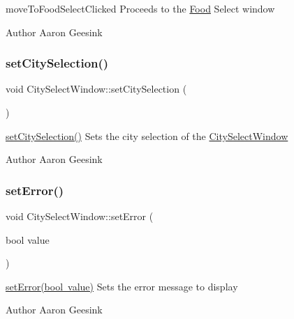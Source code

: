move\+To\+Food\+Select\+Clicked Proceeds to the \mbox{\hyperlink{class_food}{Food}} Select window 

\begin{DoxyAuthor}{Author}
Aaron Geesink 
\end{DoxyAuthor}
\mbox{\label{class_city_select_window_a771b0feebb7c7fdb1714917b337a37f3}} 
\subsubsection{\texorpdfstring{setCitySelection()}{setCitySelection()}}
{\footnotesize\ttfamily void City\+Select\+Window\+::set\+City\+Selection (\begin{DoxyParamCaption}{ }\end{DoxyParamCaption})}



\mbox{\hyperlink{class_city_select_window_a771b0feebb7c7fdb1714917b337a37f3}{set\+City\+Selection()}} Sets the city selection of the \mbox{\hyperlink{class_city_select_window}{City\+Select\+Window}} 

\begin{DoxyAuthor}{Author}
Aaron Geesink 
\end{DoxyAuthor}
\mbox{\label{class_city_select_window_a0c8d03d414fbb798fff86af385902748}} 
\subsubsection{\texorpdfstring{setError()}{setError()}}
{\footnotesize\ttfamily void City\+Select\+Window\+::set\+Error (\begin{DoxyParamCaption}\item[{bool}]{value }\end{DoxyParamCaption})}



\mbox{\hyperlink{class_city_select_window_a0c8d03d414fbb798fff86af385902748}{set\+Error(bool value)}} Sets the error message to display 

\begin{DoxyAuthor}{Author}
Aaron Geesink 
\end{DoxyAuthor}

